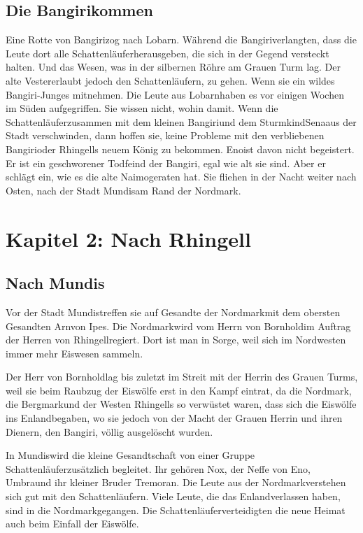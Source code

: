 \documentclass[12pt,a4paper,onecolumn,twoside,ngerman]{book}
\newcommand{\Sena}{Sena}
\newcommand{\Sturmkind}{Sturmkind}
\newcommand{\Bangiri}{Bangiri}
\newcommand{\Enland}{Enland}
\newcommand{\Schattenjager}{Schattenläufer}
\newcommand{\Eno}{Eno}
\newcommand{\Nox}{Nox}
\newcommand{\Umbra}{Umbra}
\newcommand{\Tremor}{Tremor}
\newcommand{\Lobarn}{Lobarn}
\newcommand{\Vester}{Vester}
\newcommand{\Naimo}{Naimo}
\newcommand{\Nordmark}{Nordmark}
\newcommand{\Bergmark}{Bergmark}
\newcommand{\Ipes}{Ipes}
\newcommand{\Bornhold}{Bornhold}
\newcommand{\Arn}{Arn}
\newcommand{\Rhingell}{Rhingell}
\newcommand{\Mundis}{Mundis}
\begin{document}
\section{Die \Bangiri kommen}
Eine Rotte von \Bangiri zog nach \Lobarn.
Während die \Bangiri verlangten, dass die Leute dort alle \Schattenjager herausgeben, die sich in der Gegend versteckt halten. Und das Wesen, was in der silbernen Röhre am Grauen Turm lag.
Der alte \Vester erlaubt jedoch den \Schattenjager{n}, zu gehen. Wenn sie ein wildes \Bangiri{-}Junges mitnehmen. Die Leute aus \Lobarn haben es vor einigen Wochen im Süden aufgegriffen. Sie wissen nicht, wohin damit. Wenn die \Schattenjager zusammen mit dem kleinen \Bangiri und dem \Sturmkind \Sena aus der Stadt verschwinden, dann hoffen sie, keine Probleme mit den verbliebenen \Bangiri oder \Rhingell{s} neuem König zu bekommen. \Eno ist davon nicht begeistert. Er ist ein geschworener Todfeind der \Bangiri{,} egal wie alt sie sind. Aber er schlägt ein, wie es die alte \Naimo geraten hat. Sie fliehen in der Nacht weiter nach Osten, nach der Stadt \Mundis am Rand der \Nordmark.

\chapter{Kapitel 2: Nach \Rhingell}

\section{Nach \Mundis}
Vor der Stadt \Mundis treffen sie auf Gesandte der \Nordmark mit dem obersten Gesandten \Arn von \Ipes{.} Die \Nordmark wird vom Herrn von \Bornhold im Auftrag der Herren von \Rhingell regiert. Dort ist man in Sorge, weil sich im Nordwesten immer mehr Eiswesen sammeln.

Der Herr von \Bornhold lag bis zuletzt im Streit mit der Herrin des Grauen Turms, weil sie beim Raubzug der Eiswölfe erst in den Kampf  eintrat, da die \Nordmark, die \Bergmark und der Westen \Rhingell{s} so verwüstet waren, dass sich die Eiswölfe ins \Enland begaben, wo sie jedoch von der Macht der Grauen Herrin und ihren Dienern, den \Bangiri, völlig ausgelöscht wurden. 

In \Mundis wird die kleine Gesandtschaft von einer Gruppe \Schattenjager zusätzlich begleitet. Ihr gehören \Nox, der Neffe von \Eno, \Umbra und ihr kleiner Bruder \Tremor an. Die Leute aus der \Nordmark verstehen sich gut mit den \Schattenjager{n}. Viele Leute, die das \Enland verlassen haben, sind in die \Nordmark gegangen. Die \Schattenjager verteidigten die neue Heimat auch beim Einfall der Eiswölfe. 
\end{document}
